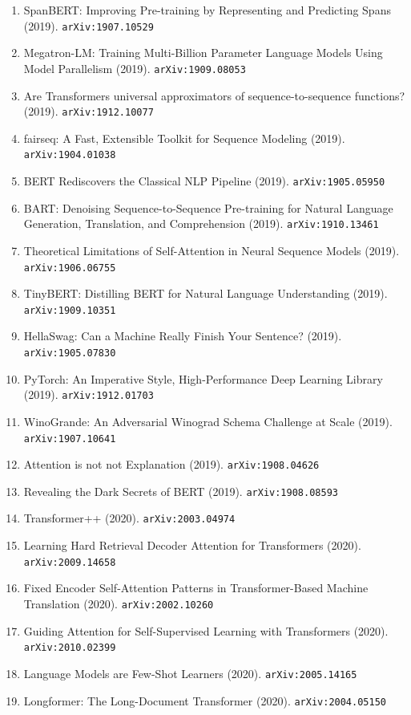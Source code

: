 \documentclass[11pt]{article}
\begin{document}
\begin{enumerate}
  \item SpanBERT: Improving Pre-training by Representing and Predicting Spans (2019). \texttt{arXiv:1907.10529}
  \item Megatron-LM: Training Multi-Billion Parameter Language Models Using
  Model Parallelism (2019). \texttt{arXiv:1909.08053}
  \item Are Transformers universal approximators of sequence-to-sequence
  functions? (2019). \texttt{arXiv:1912.10077}
  \item fairseq: A Fast, Extensible Toolkit for Sequence Modeling (2019). \texttt{arXiv:1904.01038}
  \item BERT Rediscovers the Classical NLP Pipeline (2019). \texttt{arXiv:1905.05950}
  \item BART: Denoising Sequence-to-Sequence Pre-training for Natural Language
  Generation, Translation, and Comprehension (2019). \texttt{arXiv:1910.13461}
  \item Theoretical Limitations of Self-Attention in Neural Sequence Models (2019). \texttt{arXiv:1906.06755}
  \item TinyBERT: Distilling BERT for Natural Language Understanding (2019). \texttt{arXiv:1909.10351}
  \item HellaSwag: Can a Machine Really Finish Your Sentence? (2019). \texttt{arXiv:1905.07830}
  \item PyTorch: An Imperative Style, High-Performance Deep Learning Library (2019). \texttt{arXiv:1912.01703}
  \item WinoGrande: An Adversarial Winograd Schema Challenge at Scale (2019). \texttt{arXiv:1907.10641}
  \item Attention is not not Explanation (2019). \texttt{arXiv:1908.04626}
  \item Revealing the Dark Secrets of BERT (2019). \texttt{arXiv:1908.08593}
  \item Transformer++ (2020). \texttt{arXiv:2003.04974}
  \item Learning Hard Retrieval Decoder Attention for Transformers (2020). \texttt{arXiv:2009.14658}
  \item Fixed Encoder Self-Attention Patterns in Transformer-Based Machine
  Translation (2020). \texttt{arXiv:2002.10260}
  \item Guiding Attention for Self-Supervised Learning with Transformers (2020). \texttt{arXiv:2010.02399}
  \item Language Models are Few-Shot Learners (2020). \texttt{arXiv:2005.14165}
  \item Longformer: The Long-Document Transformer (2020). \texttt{arXiv:2004.05150}

\end{enumerate}
\end{document}
